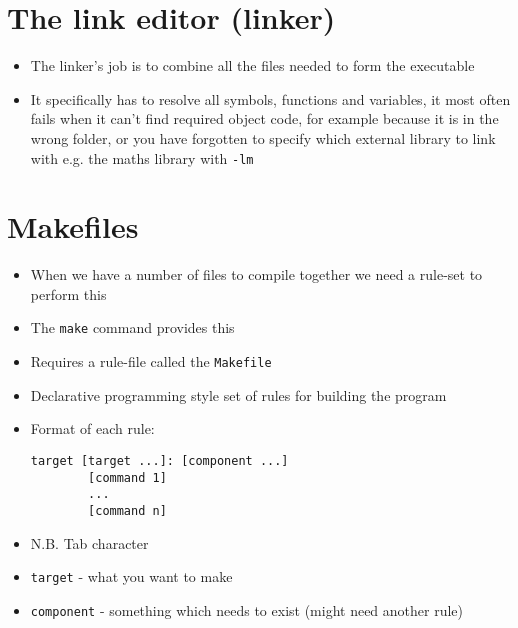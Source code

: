 \documentclass{article}
\begin{document}
\section{The link editor (linker)}
\begin{center}
\end{center}
\begin{itemize}
\item The linker's job is to combine all the files needed to form the executable

\item It specifically has to resolve all symbols, functions and variables, it most often fails when it can't find required object code, for example because it is in the wrong folder, or you have forgotten to specify which external library to link with e.g. the maths library with \verb~-lm~
\end{itemize}




\section{Makefiles}
\begin{itemize}
\item When we have a number of files to compile together we need a rule-set to perform this
\item The \verb!make! command provides this
\item Requires a rule-file called the \verb!Makefile!
\item Declarative programming style set of rules for building the program
\item Format of each rule:
\begin{verbatim}
target [target ...]: [component ...]
        [command 1]
        ...
        [command n]
\end{verbatim}
\item N.B. Tab character
\item \verb!target! - what you want to make
\item \verb!component! - something which needs to exist (might need another rule)
\end{itemize}
\end{document}

